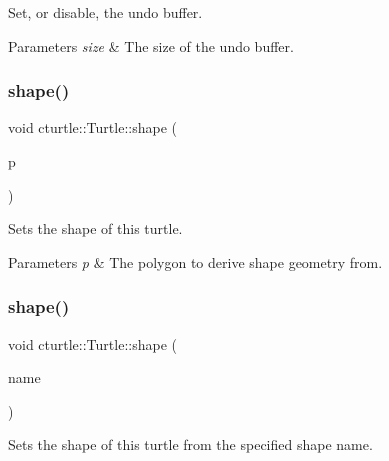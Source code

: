 Set, or disable, the undo buffer. 


\begin{DoxyParams}{Parameters}
{\em size} & The size of the undo buffer. \\
\hline
\end{DoxyParams}
\mbox{\label{classcturtle_1_1Turtle_a5143887bbdb59bb55f583b62b2152a8e}} 
\subsubsection{\texorpdfstring{shape()}{shape()}\hspace{0.1cm}{\footnotesize\ttfamily [1/2]}}
{\footnotesize\ttfamily void cturtle\+::\+Turtle\+::shape (\begin{DoxyParamCaption}\item[{const \hyperlink{classcturtle_1_1AbstractDrawableObject}{Abstract\+Drawable\+Object} \&}]{p }\end{DoxyParamCaption})\hspace{0.3cm}{\ttfamily [inline]}}



Sets the shape of this turtle. 


\begin{DoxyParams}{Parameters}
{\em p} & The polygon to derive shape geometry from. \\
\hline
\end{DoxyParams}
\mbox{\label{classcturtle_1_1Turtle_aecd7fb607369e3ece1854caa6ed92128}} 
\subsubsection{\texorpdfstring{shape()}{shape()}\hspace{0.1cm}{\footnotesize\ttfamily [2/2]}}
{\footnotesize\ttfamily void cturtle\+::\+Turtle\+::shape (\begin{DoxyParamCaption}\item[{const std\+::string \&}]{name }\end{DoxyParamCaption})}



Sets the shape of this turtle from the specified shape name. 


